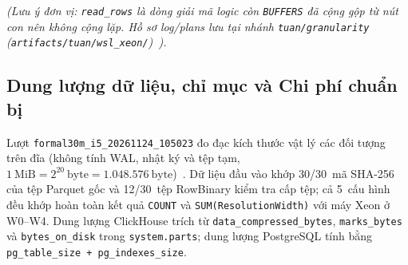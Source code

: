 \documentclass[13pt,a4paper]{report}
\begin{document}
\begin{table}[!htb]
\centering
\scriptsize
\renewcommand{\arraystretch}{1.08}
\caption[Bằng chứng kế hoạch thực thi CH1 vs PostgreSQL (W0--W4)]{Bằng chứng kế hoạch thực thi CH1 (\texttt{EXPLAIN indexes=1}~\cite{S7}) và PostgreSQL (\texttt{EXPLAIN (ANALYZE, BUFFERS)}~\cite{P9})}
\label{tab:ch4_explain}
\end{table}

\noindent\textit{(Lưu ý đơn vị: \texttt{read\_\allowbreak{}rows} là dòng giải mã logic còn \texttt{BUFFERS} đã cộng gộp từ nút con nên không cộng lặp. Hồ sơ log/plans lưu tại nhánh \texttt{tuan/\allowbreak{}granularity} (\texttt{artifacts/\allowbreak{}tuan/\allowbreak{}wsl\_\allowbreak{}xeon/\allowbreak{}})~\cite{M7}).}

\subsection{Dung lượng dữ liệu, chỉ mục và Chi phí chuẩn bị}
Lượt \texttt{formal30m\_\allowbreak{}i5\_\allowbreak{}20261124\_\allowbreak{}105023} đo đạc kích thước vật lý các đối tượng trên đĩa (không tính WAL, nhật ký và tệp tạm, $1~\text{MiB} = 2^{20}~\text{byte} = 1.048.576~\text{byte}$)~\cite{S6, P10}. Dữ liệu đầu vào khớp 30/30~mã SHA-256 của tệp Parquet gốc và 12/30~tệp RowBinary kiểm tra cấp tệp; cả 5~cấu hình đều khớp hoàn toàn kết quả \texttt{COUNT} và \texttt{SUM(\allowbreak{}ResolutionWidth)} với máy Xeon ở W0--W4. Dung lượng ClickHouse trích từ \texttt{data\_\allowbreak{}compressed\_\allowbreak{}bytes}, \texttt{marks\_\allowbreak{}bytes} và \texttt{bytes\_\allowbreak{}on\_\allowbreak{}disk} trong \texttt{system.\allowbreak{}parts}; dung lượng PostgreSQL tính bằng \texttt{pg\_\allowbreak{}table\_\allowbreak{}size + pg\_\allowbreak{}indexes\_\allowbreak{}size}.
\end{document}
